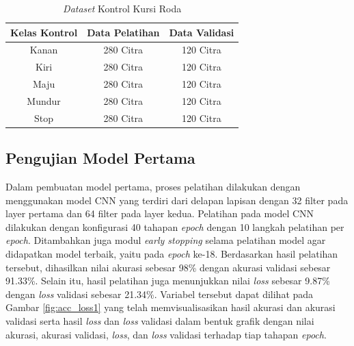 \begin{longtable}{|c|c|c|}
  \caption{\emph{Dataset} Kontrol {Kursi Roda}}
  \label{tb:datadiagram} \\
  \hline
  \rowcolor[HTML]{C0C0C0}
  \textbf{Kelas Kontrol} & \textbf{Data Pelatihan} & \textbf{Data Validasi} \\ \hline
  Kanan            & 280 Citra               & 120 Citra               \\ \hline
  Kiri              & 280 Citra               & 120 Citra               \\ \hline
  Maju             & 280 Citra               & 120 Citra               \\ \hline
  Mundur            & 280 Citra               & 120 Citra               \\ \hline
  Stop             & 280 Citra               & 120 Citra               \\ \hline
\end{longtable}

\subsection{Pengujian Model Pertama}

Dalam pembuatan model pertama, proses pelatihan dilakukan dengan menggunakan model CNN yang terdiri dari delapan lapisan dengan 32 filter pada layer pertama dan 64 filter pada layer kedua. Pelatihan pada model CNN dilakukan dengan konfigurasi 40 tahapan \emph{epoch} dengan 10 langkah pelatihan per \emph{epoch}. Ditambahkan juga modul \emph{early stopping} selama pelatihan model agar didapatkan model terbaik, yaitu pada \emph{epoch} ke-18. Berdasarkan hasil pelatihan tersebut, dihasilkan nilai akurasi sebesar 98\% dengan akurasi validasi sebesar 91.33\%. Selain itu, hasil pelatihan juga menunjukkan nilai \emph{loss} sebesar 9.87\% dengan \emph{loss} validasi sebesar 21.34\%. Variabel tersebut dapat dilihat pada Gambar \ref{fig:acc_loss1} yang telah memvisualisasikan hasil akurasi dan akurasi validasi serta hasil \emph{loss} dan \emph{loss} validasi dalam bentuk grafik dengan nilai akurasi, akurasi validasi, \emph{loss}, dan \emph{loss} validasi terhadap tiap tahapan \emph{epoch}. 

